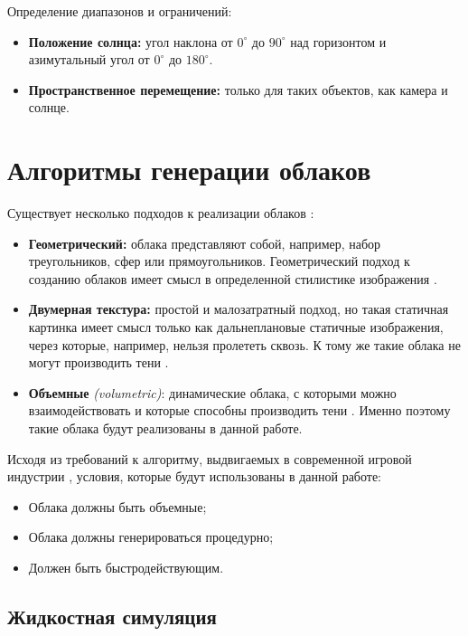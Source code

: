 Определение диапазонов и ограничений:
\begin{itemize}
	\item \textbf{Положение солнца:} угол наклона от $0^{\circ}$ до $90^{\circ}$ над горизонтом и азимутальный угол от $0^{\circ}$ до $180^{\circ}$.
	\item \textbf{Пространственное перемещение:} только для таких объектов, как камера и солнце.
\end{itemize}

\section{Алгоритмы генерации облаков}
Существует несколько подходов к реализации облаков \cite{unigine_volumetric_clouds_2022,guerrilla_volumetric_cloudscapes_2023,  sym10040125}:	\begin{itemize}
\item \textbf{Геометрический:} облака представляют собой, например, набор треугольников, сфер или прямоугольников. Геометрический подход к созданию облаков имеет смысл в определенной стилистике изображения \cite{unigine_volumetric_clouds_2022}.
\item \textbf{Двумерная текстура:} простой и малозатратный подход, но такая статичная картинка имеет смысл только как дальнеплановые статичные изображения, через которые, например, нельзя пролететь сквозь. К тому же такие облака не могут производить тени \cite{unigine_volumetric_clouds_2022}.
\item \textbf{Объемные} \textit{(volumetric)}: динамические облака, с которыми можно взаимодействовать и которые способны производить тени \cite{shadows2023, guerrilla_volumetric_cloudscapes_2023}. Именно поэтому такие облака будут реализованы в данной работе.
\end{itemize}

Исходя из требований к алгоритму, выдвигаемых в современной игровой индустрии \cite{unigine_volumetric_clouds_2022,guerrilla_volumetric_cloudscapes_2023,  sym10040125}, условия, которые будут использованы в данной работе:
\begin{itemize}
	\item Облака должны быть объемные;
	\item Облака должны генерироваться процедурно;
	\item Должен быть быстродействующим.
\end{itemize}
\subsection{Жидкостная симуляция} 

